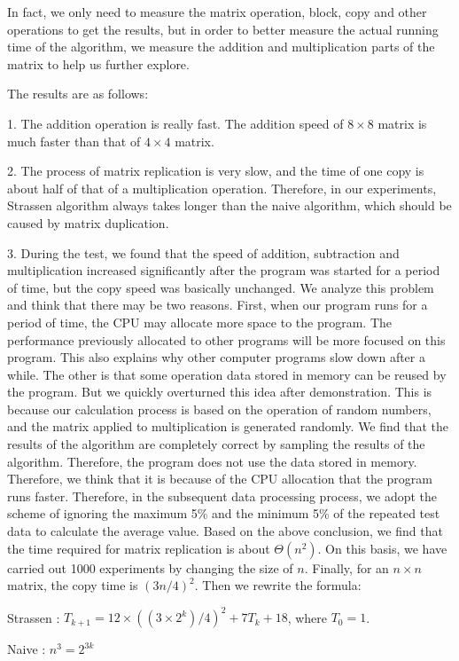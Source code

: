 \documentclass[journal]{IEEEtran}
\begin{document}
In fact, we only need to measure the matrix operation, block, copy and other operations to get the results, but in order to better measure the actual running time of the algorithm, we measure the addition and multiplication parts of the matrix to help us further explore.


The results are as follows:


1. The addition operation is really fast. The addition speed of $8\times 8$ matrix is much faster than that of $4 \times 4$ matrix.


2. The process of matrix replication is very slow, and the time of one copy is about half of that of a multiplication operation.
Therefore, in our experiments, Strassen algorithm always takes longer than the naive algorithm, which should be caused by matrix duplication.


3. During the test, we found that the speed of addition, subtraction and multiplication increased significantly after the program was started for a period of time, but the copy speed was basically unchanged.
We analyze this problem and think that there may be two reasons.
First, when our program runs for a period of time, the CPU may allocate more space to the program.
The performance previously allocated to other programs will be more focused on this program.
This also explains why other computer programs slow down after a while.
The other is that some operation data stored in memory can be reused by the program.
But we quickly overturned this idea after demonstration.
This is because our calculation process is based on the operation of random numbers, and the matrix applied to multiplication is generated randomly.
We find that the results of the algorithm are completely correct by sampling the results of the algorithm.
Therefore, the program does not use the data stored in memory.
Therefore, we think that it is because of the CPU allocation that the program runs faster.
Therefore, in the subsequent data processing process, we adopt the scheme of ignoring the maximum 5\% and the minimum 5\% of the repeated test data to calculate the average value.
Based on the above conclusion, we find that the time required for matrix replication is about $\Theta(n^2)$.
On this basis, we have carried out 1000 experiments by changing the size of $n$. Finally, for an $n \times n$ matrix, the copy time is $(3n/4)^2$.
Then we rewrite the formula:


Strassen : $ T_{k+1}=12\times((3\times 2^k)/4)^2+7T_k + 18$, where $T_0 = 1$.


Naive : $n^3=2^{3k}$
\end{document}
